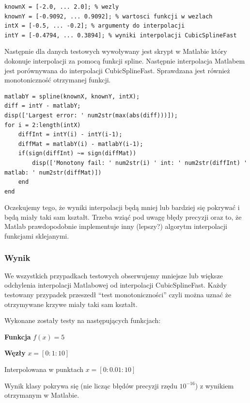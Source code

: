 \documentclass[a4paper,11pt,notitlepage]{article}
\begin{document}
\begin{lstlisting}
knownX = [-2.0, ... 2.0]; % wezly
knownY = [-0.9092, ... 0.9092]; % wartosci funkcji w wezlach
intX = [-0.5, ... -0.2]; % argumenty do interpolacji
intY = [-0.4794, ... 0.3894]; % wyniki interpolacji CubicSplineFast
\end{lstlisting}

Następnie dla danych testowych wywoływany jest skrypt w Matlabie który dokonuje interpolacji za pomocą funkcji spline. Następnie interpolacja Matlabem jest porównywana do interpolacji CubicSplineFast. Sprawdzana jest również monotoniczność otrzymanej funkcji.

\begin{lstlisting}
matlabY = spline(knownX, knownY, intX);
diff = intY - matlabY;
disp(['Largest error: ' num2str(max(abs(diff)))]);
for i = 2:length(intX)
    diffInt = intY(i) - intY(i-1);
    diffMat = matlabY(i) - matlabY(i-1);
    if(sign(diffInt) ~= sign(diffMat))
        disp(['Monotony fail: ' num2str(i) ' int: ' num2str(diffInt) ' matlab: ' num2str(diffMat)])
    end
end
\end{lstlisting}

Oczekujemy tego, że wyniki interpolacji będą mniej lub bardziej się pokrywać i będą miały taki sam kształt. Trzeba wziąć pod uwagę błędy precyzji oraz to, że Matlab prawdopodobnie implementuje inny (lepszy?) algorytm interpolacji funkcjami sklejanymi.

\subsubsection{Wynik}

We wszystkich przypadkach testowych obserwujemy mniejsze lub większe odchylenia interpolacji Matlabowej od interpolacji CubicSplineFast. Każdy testowany przypadek przeszedł ``test monotoniczności'' czyli można uznać że otrzymywane krzywe miały taki sam kształt.

Wykonane zostały testy na następujących funkcjach:


\vspace{1cm}

\textbf{Funkcja} $f(x) = 5$

\textbf{Węzły} $x = [0:1:10]$

Interpolowana w punktach $x = [0:0.01:10]$

Wynik klasy pokrywa się (nie licząc błędów precyzji rzędu $10^{-16}$) z wynikiem otrzymanym w Matlabie.
\end{document}
